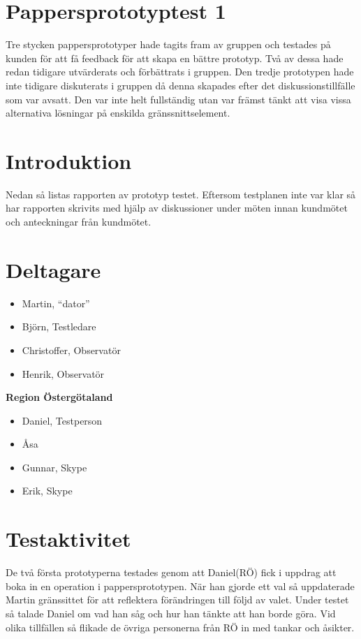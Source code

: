 \documentclass[a4paper,10pt, twoside]{article}
\begin{document}
\section{Pappersprototyptest 1}
Tre stycken pappersprototyper hade tagits fram av gruppen och testades på kunden för att få feedback för att skapa en bättre prototyp. Två av dessa hade redan tidigare utvärderats och förbättrats i gruppen. Den tredje prototypen hade inte tidigare diskuterats i gruppen då denna skapades efter det diskussionstillfälle som var avsatt. Den var inte helt fullständig utan var främst tänkt att visa vissa alternativa lösningar på enskilda gränssnittselement.
\section{Introduktion}
Nedan så listas rapporten av prototyp testet. Eftersom testplanen inte var klar så har rapporten skrivits med hjälp av diskussioner under möten innan kundmötet och anteckningar från kundmötet.
\section{Deltagare}
\begin{itemize}
\item Martin, “dator”
\item Björn, Testledare
\item Christoffer, Observatör
\item Henrik, Observatör
\end{itemize}

\textbf{Region Östergötaland}
\begin{itemize}
\item Daniel, Testperson
\item Åsa
\item Gunnar, Skype
\item Erik, Skype
\end{itemize}
\section{Testaktivitet}
De två första prototyperna testades genom att Daniel(RÖ) fick i uppdrag att boka in en operation i pappersprototypen. När han gjorde ett val så uppdaterade Martin gränssittet för att reflektera förändringen till följd av valet. Under testet så talade Daniel om vad han såg och hur han tänkte att han borde göra. Vid olika tillfällen så flikade de övriga personerna från RÖ in med tankar och åsikter.
\end{document}

